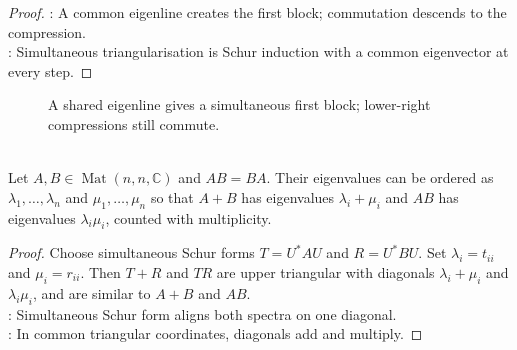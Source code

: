 \begin{theorem}
\begin{proof}
: A common eigenline creates the first block; commutation descends to the compression.\\
: Simultaneous triangularisation is Schur induction with a common eigenvector at every step.
\end{proof}
\end{theorem}

\begin{figure}[H]
  \centering
  
  \caption{A shared eigenline gives a simultaneous first block; lower-right compressions still commute.}
  \label{fig:simultaneous-triangularization-commuting}
\end{figure}

\begin{corollary} \label{cor:commuting-sum-product-eigenvalues} \\
Let $A,B\in\operatorname{Mat}(n,n,\mathbb{C})$ and $AB=BA$. Their eigenvalues can be ordered as $\lambda_1,\ldots,\lambda_n$ and $\mu_1,\ldots,\mu_n$ so that $A+B$ has eigenvalues $\lambda_i+\mu_i$ and $AB$ has eigenvalues $\lambda_i\mu_i$, counted with multiplicity.
\begin{proof}
Choose simultaneous Schur forms $T=U^*AU$ and $R=U^*BU$. Set $\lambda_i=t_{ii}$ and $\mu_i=r_{ii}$. Then $T+R$ and $TR$ are upper triangular with diagonals $\lambda_i+\mu_i$ and $\lambda_i\mu_i$, and are similar to $A+B$ and $AB$.\\
: Simultaneous Schur form aligns both spectra on one diagonal.\\
: In common triangular coordinates, diagonals add and multiply.
\end{proof}
\end{corollary}
